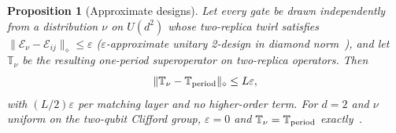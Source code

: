 \documentclass[aps,prx,reprint,superscriptaddress,nobibnotes,longbibliography]{revtex4-2}
\newtheorem{proposition}{Proposition}
\theoremstyle{remark}
\newcommand{\Tper}{\mathbb T_{\rm period}}
\begin{document}
\begin{proposition}[Approximate designs]
\label{prop:design}
Let every gate be drawn independently from a distribution $\nu$ on $U(d^2)$ whose two-replica twirl satisfies $\|\mathcal E_\nu-\mathcal E_{ij}\|_\diamond\le\varepsilon$ ($\varepsilon$-approximate unitary 2-design in diamond norm~\cite{Brandao2016}), and let $\mathbb T_\nu$ be the resulting one-period superoperator on two-replica operators.  Then
\begin{equation}
 \|\mathbb T_\nu-\Tper\|_\diamond\le L\varepsilon,
 \label{eq:designbound}
\end{equation}
with $(L/2)\varepsilon$ per matching layer and no higher-order term.  For $d=2$ and $\nu$ uniform on the two-qubit Clifford group, $\varepsilon=0$ and $\mathbb T_\nu=\Tper$ exactly~\cite{DiVincenzo2002}.
\end{proposition}
\end{document}
